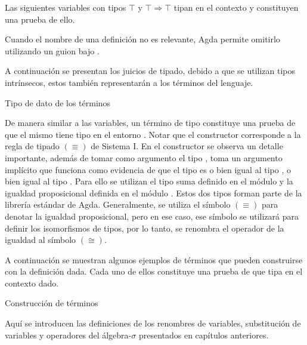 \begin{example}
	Las siguientes variables con tipos $\top$ y $\top \Rightarrow \top$ tipan en el contexto \const{$\emptyset , \top \Rightarrow \top , \top$} y constituyen una prueba de ello.
	
	Cuando el nombre de una definición no es relevante, Agda permite omitirlo utilizando un guion bajo \func{\_}.
	
\end{example}

A continuación se presentan los juicios de tipado, debido a que se utilizan tipos intrínsecos, estos también representarán a los términos del lenguaje.

\begin{codigo}
	Tipo de dato de los términos
	
\end{codigo}

De manera similar a las variables, un término de tipo \bound{$\Gamma$} \type{$\vdash$}  constituye una prueba de que el mismo tiene tipo  en el entorno \bound{$\Gamma$}.
Notar que el constructor  corresponde a la regla de tipado $(\equiv)$ de Sistema I.
En el constructor \const{$\pi$} se observa un detalle importante, además de tomar como argumento el tipo , toma un argumento implícito que funciona como evidencia de que el tipo  es o bien igual al tipo , o bien igual al tipo .
Para ello se utilizan el tipo suma \type{$\_\uplus\_$} definido en el módulo  y la igualdad proposicional \type{$\_\cong\_$} definida en el módulo .
Estos dos tipos forman parte de la librería estándar de Agda.
Generalmente, se utiliza el símbolo $(\equiv)$ para denotar la igualdad proposicional, pero en ese caso, ese símbolo se utilizará para definir los isomorfismos de tipos, por lo tanto, se renombra el operador de la igualdad al símbolo $(\cong)$.

A continuación se muestran algunos ejemplos de términos que pueden construirse con la definición dada.
Cada uno de ellos constituye una prueba de que tipa en el contexto dado.

\begin{example}
	Construcción de términos
\end{example}

Aquí se introducen las definiciones de los renombres de variables, substitución de variables y operadores del álgebra-$\sigma$ presentados en capítulos anteriores.

